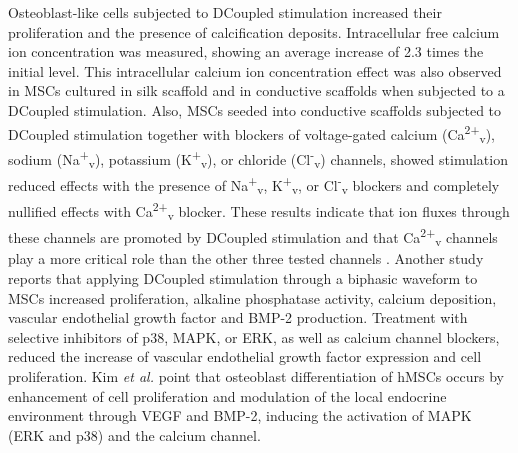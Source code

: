 Osteoblast-like cells subjected to \acs{DCoupled} stimulation \cite{Wang1998-ek} increased their proliferation and the presence of calcification deposits. Intracellular free calcium ion concentration was measured, showing an average increase of 2.3 times the initial level. This intracellular calcium ion concentration effect was also observed in \ac{MSCs} cultured in silk scaffold \cite{Cakmak2016-oj} and in conductive scaffolds \cite{Zhang2016-ul} when subjected to a \acs{DCoupled} stimulation. Also, \acs{MSCs} seeded into conductive scaffolds subjected to \acs{DCoupled} stimulation together with blockers of voltage-gated calcium (Ca\textsuperscript{2+}\textsubscript{v}), sodium (Na\textsuperscript{+}\textsubscript{v}), potassium (K\textsuperscript{+}\textsubscript{v}), or chloride (Cl\textsuperscript{-}\textsubscript{v}) channels, showed stimulation reduced effects with the presence of Na\textsuperscript{+}\textsubscript{v}, K\textsuperscript{+}\textsubscript{v}, or Cl\textsuperscript{-}\textsubscript{v} blockers and completely nullified effects with Ca\textsuperscript{2+}\textsubscript{v} blocker. These results indicate that ion fluxes through these channels are promoted by \acs{DCoupled} stimulation and that Ca\textsuperscript{2+}\textsubscript{v} channels play a more critical role than the other three tested channels \cite{Zhang2016-ul}. Another study \cite{Kim2009-dv} reports that applying \acs{DCoupled} stimulation through a biphasic waveform to \acs{MSCs} increased proliferation, alkaline phosphatase activity, calcium deposition, vascular endothelial growth factor and
BMP-2 production. Treatment with selective inhibitors of p38, MAPK, or ERK, as well as calcium channel blockers, reduced the increase
of vascular endothelial growth factor expression and cell proliferation. Kim \textit{et al.} \cite{Kim2009-dv} point that osteoblast differentiation of hMSCs occurs by enhancement of cell proliferation and modulation of the local endocrine environment through \ac{VEGF} and BMP-2, inducing the activation of MAPK (ERK and p38) and the calcium channel.

